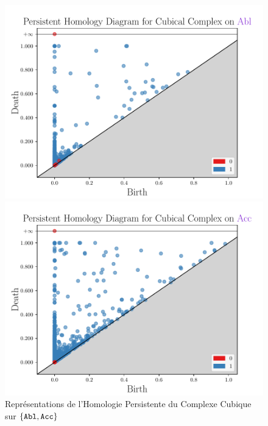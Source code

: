 \documentclass{cours}
\begin{document}
\begin{figure}[H]
\begin{minipage}{.5\textwidth}
	\begin{center}
	\includegraphics[width=\linewidth]{Figures/Visualisations/cc_Abl}
	\end{center}
\end{minipage}
\begin{minipage}{.5\textwidth}
	\begin{center}
	\includegraphics[width=\linewidth]{Figures/Visualisations/cc_Acc}
	\end{center}
\end{minipage}
\caption{Représentations de l'Homologie Persistente du Complexe Cubique sur $\{\tt Abl,Acc\}$}
\end{figure}
\end{document}

